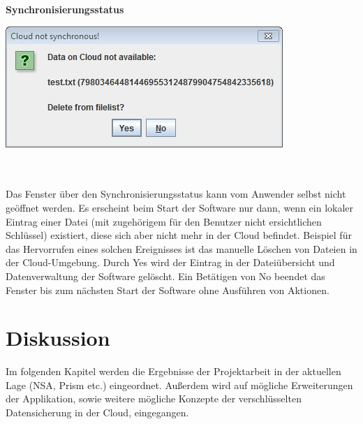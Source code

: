 \documentclass[12pt,a4paper,bibliography=totocnumbered,listof=totocnumbered]{scrartcl}
\begin{document}
\textbf{Synchronisierungsstatus}
\vspace{1em}
$\;$\\
\begin{minipage}{\linewidth}
	\centering
	\includegraphics[width=0.4\linewidth]{Synchron.jpg}
	\label{Synchron}
\end{minipage}
\\\\Das Fenster über den Synchronisierungsstatus kann vom Anwender selbst nicht geöffnet werden. Es erscheint beim Start der Software nur dann, wenn ein lokaler Eintrag einer Datei (mit zugehörigem für den Benutzer nicht ersichtlichen Schlüssel) existiert, diese sich aber nicht mehr in der Cloud befindet. Beispiel für das Hervorrufen eines solchen Ereignisses ist das manuelle Löschen von Dateien in der Cloud-Umgebung. Durch Yes wird der Eintrag in der Dateiübersicht und Datenverwaltung der Software gelöscht. Ein Betätigen von No beendet das Fenster bis zum nächsten Start der Software ohne Ausführen von Aktionen.
\pagebreak

\section{Diskussion}\label{DiskussionV}
Im folgenden Kapitel werden die Ergebnisse der Projektarbeit in der aktuellen Lage (NSA, Prism etc.) eingeordnet. Außerdem wird auf mögliche Erweiterungen der Applikation, sowie weitere mögliche Konzepte der verschlüsselten Datensicherung in der Cloud, eingegangen. 
\end{document}
